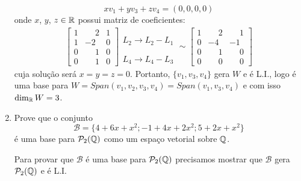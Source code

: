 \begin{exemplos}
\begin{enumerate}
\begin{solucao}
        \[
          xv_1 + yv_3 + zv_4 = (0, 0, 0, 0)
        \]
        onde $x$, $y$, $z \in \mathbb{R}$ possui matriz de coeficientes:
        \begin{align*}
          \begin{bmatrix}
            1 & \phantom{-}2 & 1\\
            1 & -2 & 0\\
            0 & \phantom{-}1 & 0\\
            0 & \phantom{-}1 & 0
          \end{bmatrix}
          \begin{array}{l}
            \phantom{x}\\L_2 \to L_2 - L_1\\\phantom{x}\\L_4 \to L_4 - L_3
          \end{array}\sim
          \begin{bmatrix}
            1 & \phantom{-}2 & \phantom{-}1\\
            0 & -4 & -1\\
            0 & \phantom{-}1 & \phantom{-}0\\
            0 & \phantom{-}0 & \phantom{-}0
          \end{bmatrix}
        \end{align*}
        cuja solução será $x = y = z = 0$. Portanto, $\{v_1, v_3, v_4\}$ gera $W$ e é L.I., logo é uma base para $W = Span(v_1, v_2, v_3, v_4) = Span(v_1, v_3, v_4)$ e com isso $\dim_{\mathbb{R}} W = 3$.
      \end{solucao}

    \item Prove que o conjunto
      \[
        \mathcal{B} = \{4 + 6x + x^2; -1 + 4x + 2x^2; 5 + 2x + x^2\}
      \]
      é uma base para $\mathcal{P}_2(\mathbb{Q})$ como um espaço vetorial sobre $\mathbb{Q}$.
      \begin{solucao}
        Para provar que $\mathcal{B}$ é uma base para $\mathcal{P}_2(\mathbb{Q})$ precisamos mostrar que $\mathcal{B}$ gera $\mathcal{P}_2(\mathbb{Q})$ e é L.I.


\end{solucao}
\end{enumerate}
\end{exemplos}

